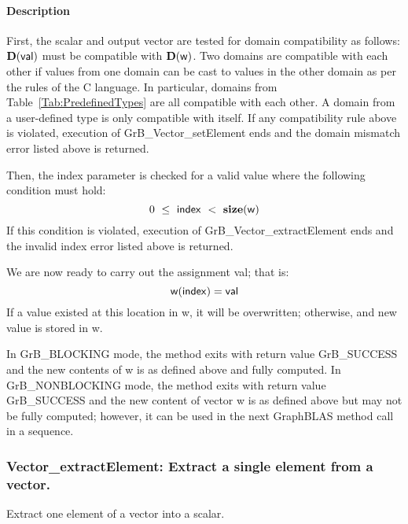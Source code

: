 \paragraph{Description}

First, the scalar and output vector are tested for domain compatibility as follows:
$\mathbf{D}({\sf val})$ must be compatible with $\mathbf{D}({\sf w})$. Two domains 
are compatible with each other if values from one domain can be cast to values 
in the other domain as per the rules of the C language. In particular, domains 
from Table~\ref{Tab:PredefinedTypes} are all compatible with each other. A domain 
from a user-defined type is only compatible with itself. If any compatibility 
rule above is violated, execution of {\sf GrB\_Vector\_setElement} ends and 
the domain mismatch error listed above is returned.

Then, the {\sf index} parameter is checked for a valid value where the following
condition must hold:
\[
	0\ \leq\ {\sf index}\ <\ \mathbf{size}({\sf w})
\]
If this condition is violated, execution of {\sf GrB\_Vector\_extractElement} 
ends and the invalid index error listed above is returned.

We are now ready to carry out the assignment {\sf val}; that is:
\[
    {\sf w}({\sf index}) = {\sf val}
\]
If a value existed at this location in {\sf w}, it will be overwritten; otherwise,
and new value is stored in {\sf w}.

In {\sf GrB\_BLOCKING} mode, the method exits with return value 
{\sf GrB\_SUCCESS} and the new contents of {\sf w} is as defined above
and fully computed.  
In {\sf GrB\_NONBLOCKING} mode, the method exits with return value 
{\sf GrB\_SUCCESS} and the new content of vector {\sf w} is as defined above 
but may not be fully computed; however, it can be used in the next GraphBLAS 
method call in a sequence.



\subsubsection{{\sf Vector\_extractElement}: Extract a single element from a vector.}
\label{Sec:extract_single_element_vec}

Extract one element of a vector into a scalar. 

\paragraph{\syntax}

